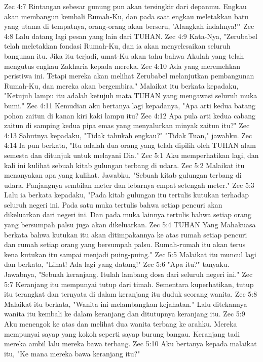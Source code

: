 Zec 4:7  Rintangan sebesar gunung pun akan tersingkir dari depanmu. Engkau akan membangun kembali Rumah-Ku, dan pada saat engkau meletakkan batu yang utama di tempatnya, orang-orang akan berseru, 'Alangkah indahnya!'"
Zec 4:8  Lalu datang lagi pesan yang lain dari TUHAN.
Zec 4:9  Kata-Nya, "Zerubabel telah meletakkan fondasi Rumah-Ku, dan ia akan menyelesaikan seluruh bangunan itu. Jika itu terjadi, umat-Ku akan tahu bahwa Akulah yang telah mengutus engkau Zakharia kepada mereka.
Zec 4:10  Ada yang meremehkan peristiwa ini. Tetapi mereka akan melihat Zerubabel melanjutkan pembangunan Rumah-Ku, dan mereka akan bergembira." Malaikat itu berkata kepadaku, "Ketujuh lampu itu adalah ketujuh mata TUHAN yang mengawasi seluruh muka bumi."
Zec 4:11  Kemudian aku bertanya lagi kepadanya, "Apa arti kedua batang pohon zaitun di kanan kiri kaki lampu itu?
Zec 4:12  Apa pula arti kedua cabang zaitun di samping kedua pipa emas yang menyalurkan minyak zaitun itu?"
Zec 4:13  Sahutnya kepadaku, "Tidak tahukah engkau?" "Tidak Tuan," jawabku.
Zec 4:14  Ia pun berkata, "Itu adalah dua orang yang telah dipilih oleh TUHAN alam semesta dan ditunjuk untuk melayani Dia."
Zec 5:1  Aku memperhatikan lagi, dan kali ini kulihat sebuah kitab gulungan terbang di udara.
Zec 5:2  Malaikat itu menanyakan apa yang kulihat. Jawabku, "Sebuah kitab gulungan terbang di udara. Panjangnya sembilan meter dan lebarnya empat setengah meter."
Zec 5:3  Lalu ia berkata kepadaku, "Pada kitab gulungan itu tertulis kutukan terhadap seluruh negeri ini. Pada satu muka tertulis bahwa setiap pencuri akan dikeluarkan dari negeri ini. Dan pada muka lainnya tertulis bahwa setiap orang yang bersumpah palsu juga akan dikeluarkan.
Zec 5:4  TUHAN Yang Mahakuasa berkata bahwa kutukan itu akan ditimpakannya ke atas rumah setiap pencuri dan rumah setiap orang yang bersumpah palsu. Rumah-rumah itu akan terus kena kutukan itu sampai menjadi puing-puing."
Zec 5:5  Malaikat itu muncul lagi dan berkata, "Lihat! Ada lagi yang datang!"
Zec 5:6  "Apa itu?" tanyaku. Jawabnya, "Sebuah keranjang. Itulah lambang dosa dari seluruh negeri ini."
Zec 5:7  Keranjang itu mempunyai tutup dari timah. Sementara kuperhatikan, tutup itu terangkat dan ternyata di dalam keranjang itu duduk seorang wanita.
Zec 5:8  Malaikat itu berkata, "Wanita ini melambangkan kejahatan." Lalu ditekannya wanita itu kembali ke dalam keranjang dan ditutupnya keranjang itu.
Zec 5:9  Aku menengok ke atas dan melihat dua wanita terbang ke arahku. Mereka mempunyai sayap yang kokoh seperti sayap burung bangau. Keranjang tadi mereka ambil lalu mereka bawa terbang.
Zec 5:10  Aku bertanya kepada malaikat itu, "Ke mana mereka bawa keranjang itu?"
